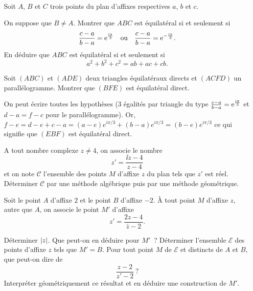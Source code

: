 \documentclass{magnolia}
\begin{document}


Soit $A$, $B$ et $C$ trois points du plan d'affixes respectives $a$, $b$ et $c$.
\begin{questions}
\question On suppose que $B\neq A$. Montrer que $ABC$ est équilatéral si et seulement si
  \[\frac{c-a}{b-a}={\rm e}^{\frac{{\rm i}\pi}{3}} \quad\text{ou}\quad \frac{c-a}{b-a}={\rm e}^{-\frac{{\rm i}\pi}{3}}.\]
\question En déduire que $ABC$ est équilatéral si et seulement si
  \[a^2+b^2+c^2=ab+ac+cb.\]
\end{questions}


Soit $(ABC)$ et $(ADE)$ deux triangles équilatéraux directs et $(ACFD)$ un parallélogramme. Montrer que $(BFE)$ est équilatéral direct.
\begin{sol}
On peut écrire toutes les hypothèses (3 égalités par triangle du type $\frac{c-a}{b-a}={\rm e}^{\frac{{\rm i}\pi}{3}}$ et $d-a=f-c$ pour le parallélogramme).
Or, $f-e=d-e+c-a=(a-e)e^{i\pi/3}+(b-a)e^{i\pi/3}=(b-e)e^{i\pi/3}$ ce qui signifie que $(EBF)$ est équilatéral direct.
\end{sol}

A tout nombre complexe $z\neq 4$, on associe le nombre \[z'=\frac{\ii z-4}{z-4}\] et on note
$\mathcal{C}$ l'ensemble des points $M$ d'affixe $z$ du plan tels que $z'$ est réel. Déterminer $\mathcal{C}$ par une méthode algébrique puis par une méthode géométrique.





Soit le point $A$ d'affixe $2$ et le point $B$ d'affixe $-2$. À tout point $M$ d'affixe $z$, autre que $A$, on associe le point $M'$ d'affixe \[z'=\dfrac{2z-4}{\bar{z}-2}.\]
\begin{questions}
\question Déterminer $\left|z\right|$. Que peut-on en déduire pour $M'$~?
\question Déterminer l'ensemble $\mathcal{E}$ des points d'affixe $z$ tels que $M'=B$.
\question Pour tout point $M$ de $\mathcal{E}$ et distincts de $A$ et $B$, que peut-on dire de \[\frac{z-2}{z'-2}~?\] Interpréter géométriquement ce résultat et en déduire une construction de $M'$.
\end{questions}
\end{document}
